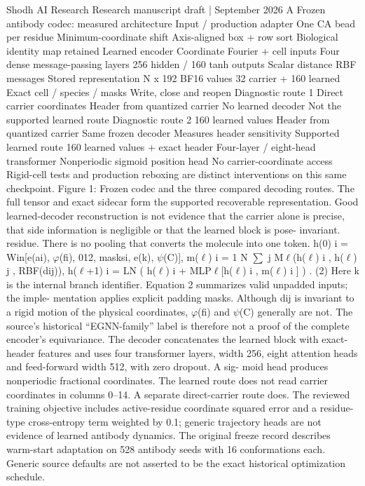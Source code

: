 \documentclass[11pt]{article}
\begin{document}
Shodh AI Research Research manuscript draft | September 2026
A  Frozen antibody codec: measured architecture
Input / production adapter
One CA bead per residue
Minimum-coordinate shift
Axis-aligned box + row sort
Biological identity map retained
Learned encoder
Coordinate Fourier + cell inputs
Four dense message-passing layers
256 hidden / 160 tanh outputs
Scalar distance RBF messages
Stored representation
N x 192 BF16 values
32 carrier + 160 learned
Exact cell / species / masks
Write, close and reopen
Diagnostic route 1
Direct carrier coordinates
Header from quantized carrier
No learned decoder
Not the supported learned route
Diagnostic route 2
160 learned values
Header from quantized carrier
Same frozen decoder
Measures header sensitivity
Supported learned route
160 learned values + exact header
Four-layer / eight-head transformer
Nonperiodic sigmoid position head
No carrier-coordinate access
Rigid-cell tests and production reboxing are distinct interventions on this same checkpoint.
Figure 1: Frozen codec and the three compared decoding routes. The full tensor and exact sidecar
form the supported recoverable representation. Good learned-decoder reconstruction is not evidence
that the carrier alone is precise, that side information is negligible or that the learned block is pose-
invariant.
residue. There is no pooling that converts the molecule into one token.
h(0)
i = Win[e(ai), \ensuremath{\varphi}(fi), 012, masksi, e(k), \ensuremath{\psi}(C)],
m(\ensuremath{\ell})
i = 1
N
\ensuremath{\sum}
j
M\ensuremath{\ell}(h(\ensuremath{\ell})
i , h(\ensuremath{\ell})
j , RBF(dij)),
h(\ensuremath{\ell}+1)
i = LN
(
h(\ensuremath{\ell})
i + MLP\ensuremath{\ell}[h(\ensuremath{\ell})
i , m(\ensuremath{\ell})
i ]
)
.
(2)
Here k is the internal branch identifier. Equation 2 summarizes valid unpadded inputs; the imple-
mentation applies explicit padding masks. Although dij is invariant to a rigid motion of the physical
coordinates, \ensuremath{\varphi}(fi) and \ensuremath{\psi}(C) generally are not. The source’s historical “EGNN-family” label is
therefore not a proof of the complete encoder’s equivariance.
The decoder concatenates the learned block with exact-header features and uses four transformer
layers, width 256, eight attention heads and feed-forward width 512, with zero dropout. A sig-
moid head produces nonperiodic fractional coordinates. The learned route does not read carrier
coordinates in columns 0–14. A separate direct-carrier route does. The reviewed training objective
includes active-residue coordinate squared error and a residue-type cross-entropy term weighted by
0.1; generic trajectory heads are not evidence of learned antibody dynamics. The original freeze
record describes warm-start adaptation on 528 antibody seeds with 16 conformations each. Generic
source defaults are not asserted to be the exact historical optimization schedule.
\end{document}
